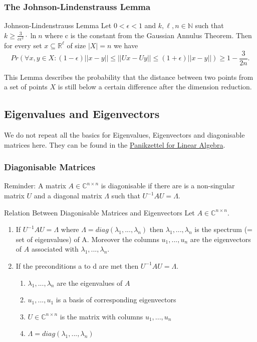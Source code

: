 \documentclass[english]{panikzettel}
\begin{document}
\subsubsection{The Johnson-Lindenstrauss Lemma}

\begin{theo}{Johnson-Lindenstrauss Lemma}
Let $0<\epsilon<1$ and $ k,\ell,n\in\mathbb{N}$ such that $k\geq \frac{3}{c\epsilon^2}\cdot \ln n$ where c is the constant from the Gaussian Annulus Theorem. Then for every set $x\subseteq \mathbb{R}^\ell$ of size $|X|=n$ we have
\[
Pr\left( \forall x,y\in X : (1-\epsilon) ||x-y||\leq ||Ux-Uy|| \leq (1+\epsilon) ||x-y|| \right)\geq 1-\frac{3}{2n}.
\]
\end{theo}
This Lemma describes the probability that the distance between two points from a set of points $X$ is still below a certain difference after the dimension reduction.


\subsection{Eigenvalues and Eigenvectors}
We do not repeat all the basics for Eigenvalues, Eigenvectors and diagonisable matrices here. They can be found in the \href{https://panikzettel.philworld.de/la.pdf}{Panikzettel for Linear Algebra}.

\subsubsection{Diagonisable Matrices}
Reminder: A matrix $A\in\mathbb{C}^{n\times n}$ is diagonisable if there are is a non-singular matrix $U$ and a diagonal matrix $\Lambda$ such that $U^{-1}AU=\Lambda$.

\begin{theo}{Relation Between Diagonisable Matrices and Eigenvectors}
Let $A\in\mathbb{C}^{n\times n}$.
\begin{enumerate}
\item If $U^{-1}AU=\Lambda$ where $\Lambda=diag(\lambda_1,...,\lambda_n)$ then $\lambda_1,...,\lambda_n$ is the spectrum (= set of eigenvalues) of A. Moreover the columns $u_1,...,u_n$ are the eigenvectors of $A$ associated with $\lambda_1,...,\lambda_n$.
\item If the preconditions a to d are met then $U^{-1}AU=\Lambda$.
\begin{enumerate}
\item $\lambda_1,...,\lambda_n$ are the eigenvalues of $A$
\item $u_1,...,u_1$ is a basis of corresponding eigenvectors
\item $U\in\mathbb{C}^{n\times n}$ is the matrix with columns $u_1,...,u_n$
\item $\Lambda=diag(\lambda_1,...,\lambda_n)$
\end{enumerate}
\end{enumerate}
\end{theo}
\end{document}
